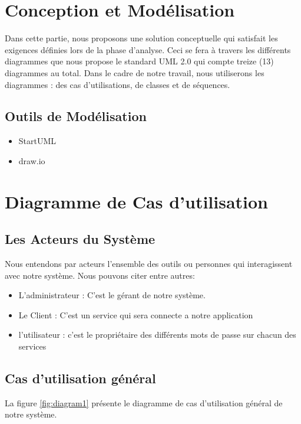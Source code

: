 \documentclass[11pt,a4paper]{report}
\begin{document}
 \section{Conception et Modélisation}
 Dans cette partie, nous proposons une solution conceptuelle qui satisfait les exigences définies lors de la phase d'analyse. Ceci se fera à travers les différents diagrammes que nous propose le standard UML 2.0 qui compte treize (13) diagrammes au total. Dans le cadre de notre travail, nous utiliserons les diagrammes : des cas d'utilisations, de classes et de séquences.
 
 \subsection{Outils de Modélisation}
 \begin{itemize}
 \item StartUML
 \item draw.io
 \end{itemize}
 \section{Diagramme de Cas d'utilisation}
 \subsection{Les Acteurs du Système}
 Nous entendons par acteurs l'ensemble des outils ou personnes qui interagissent avec notre système. Nous pouvons citer entre autres:
 \begin{itemize}
 \item L'administrateur : C'est le gérant de notre système.
 \item Le Client : C'est un service qui sera connecte a notre application
 \item l'utilisateur : c'est le propriétaire des différents mots de passe sur chacun des services
 \end{itemize}
 
 
 \subsection{Cas d'utilisation général}
 La figure \ref{fig:diagram1} présente le diagramme de cas 
 d'utilisation général de notre système.
 
\end{document}
